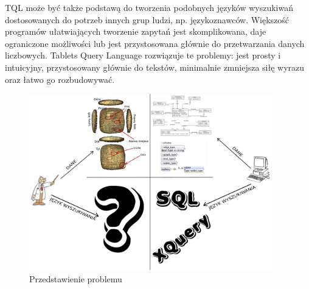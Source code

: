 



TQL może być także podstawą do tworzenia podobnych języków wyszukiwań dostosowanych do potrzeb innych grup ludzi, np. językoznawców.
Większość programów ułatwiających tworzenie zapytań jest skomplikowana, daje ograniczone możliwości lub jest przystosowana głównie do przetwarzania danych liczbowych. Tablets Query Language rozwiązuje te problemy: jest prosty i intuicyjny, przystosowany głównie do tekstów, minimalnie zmniejsza siłę wyrazu oraz łatwo go rozbudowywać. 



\begin{figure}[h]
 \centering
 \includegraphics[width=400px]{../diagramy/poco.pdf}
 \caption{Przedstawienie problemu}
 \label{fig:poco}
\end{figure}

